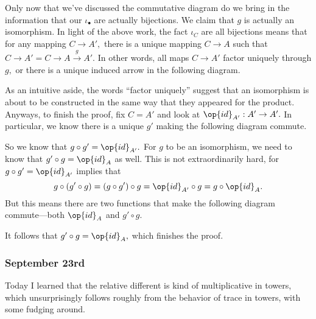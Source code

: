 Only now that we've discussed the commutative diagram do we bring in the information that our $\iota_\bullet$ are actually bijections. We claim that $g$ is actually an isomorphism. In light of the above work, the fact $\iota_C$ are all bijections means that for any mapping $C\to A',$ there is a unique mapping $C\to A$ such that $C\to A'=C\to A\stackrel g\to A'.$ In other words, all maps $C\to A'$ factor uniquely through $g,$ or there is a unique induced arrow in the following diagram.
\begin{center}
\end{center}
As an intuitive aside, the words ``factor uniquely'' suggest that an isomorphism is about to be constructed in the same way that they appeared for the product. Anyways, to finish the proof, fix $C=A'$ and look at $\op{id}_{A'}:A'\to A'.$ In particular, we know there is a unique $g'$ making the following diagram commute.
\begin{center}
\end{center}
So we know that $g\circ g'=\op{id}_{A'}.$ For $g$ to be an isomorphism, we need to know that $g'\circ g=\op{id}_A$ as well. This is not extraordinarily hard, for $g\circ g'=\op{id}_{A'}$ implies that
\[g\circ(g'\circ g)=(g\circ g')\circ g=\op{id}_{A'}\circ g=g\circ\op{id}_A.\]
But this means there are two functions that make the following diagram commute---both $\op{id}_A$ and $g'\circ g.$
\begin{center}
\end{center}
It follows that $g'\circ g=\op{id}_A,$ which finishes the proof.

\subsubsection{September 23rd}
Today I learned that the relative different is kind of multiplicative in towers, which unsurprisingly follows roughly from the behavior of trace in towers, with some fudging around.

